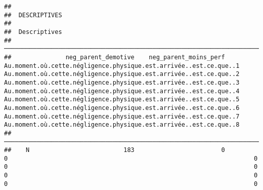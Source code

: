 \documentclass[
]{article}
\begin{document}
\begin{verbatim}
## 
##  DESCRIPTIVES
## 
##  Descriptives                                                                                                                                                                                                                                                                                                                                                                                                                                                                                                                                                                                                                        
##  ─────────────────────────────────────────────────────────────────────────────────────────────────────────────────────────────────────────────────────────────────────────────────────────────────────────────────────────────────────────────────────────────────────────────────────────────────────────────────────────────────────────────────────────────────────────────────────────────────────────────────────────────────────────────────────────────────────────────────────────────────────────────────────────────────────────────────────────────────────────────────────────────────────────────────────────────────── 
##               neg_parent_demotive    neg_parent_moins_perf    Au.moment.où.cette.négligence.physique.est.arrivée..est.ce.que..1    Au.moment.où.cette.négligence.physique.est.arrivée..est.ce.que..2    Au.moment.où.cette.négligence.physique.est.arrivée..est.ce.que..3    Au.moment.où.cette.négligence.physique.est.arrivée..est.ce.que..4    Au.moment.où.cette.négligence.physique.est.arrivée..est.ce.que..5    Au.moment.où.cette.négligence.physique.est.arrivée..est.ce.que..6    Au.moment.où.cette.négligence.physique.est.arrivée..est.ce.que..7    Au.moment.où.cette.négligence.physique.est.arrivée..est.ce.que..8   
##  ─────────────────────────────────────────────────────────────────────────────────────────────────────────────────────────────────────────────────────────────────────────────────────────────────────────────────────────────────────────────────────────────────────────────────────────────────────────────────────────────────────────────────────────────────────────────────────────────────────────────────────────────────────────────────────────────────────────────────────────────────────────────────────────────────────────────────────────────────────────────────────────────────────────────────────────────────── 
##    N                          183                        0                                                                    0                                                                    0                                                                    0                                                                    0                                                                    0                                                                    0                                                                    0                                                                    0   

\end{verbatim}
\end{document}
